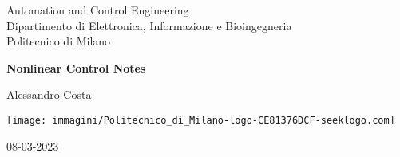 \documentclass[a4paper]{report}
\theoremstyle{definition}
\theoremstyle{definition}
\begin{document}
	\begin{titlepage}
		\clearpage\thispagestyle{empty}
		\centering
		\vspace{1cm}
		
		{\normalsize Automation and Control Engineering \\ 
			Dipartimento di Elettronica, Informazione e Bioingegneria \\
			Politecnico di Milano \par}
		\vspace{3cm}
		{\Huge \textbf{Nonlinear Control Notes}} \\ 
		\vspace{3cm}
		{\normalsize Alessandro Costa\par}
		\vspace{3cm}
		
\begin{center}
	\texttt{[image: immagini/Politecnico\_di\_Milano-logo-CE81376DCF-seeklogo.com]}
\end{center}
		
		\vspace{0.5cm}
		
	{\normalsize 08-03-2023 \par}		
	
	\vspace{1.5cm}

	
	\pagebreak
		
	\end{titlepage}
	\tableofcontents
	\pagebreak
	
	\pagebreak
	
	\pagebreak
	
	\pagebreak
	
	\pagebreak
	
	\pagebreak
	
	\pagebreak
	
	\pagebreak
\end{document}
